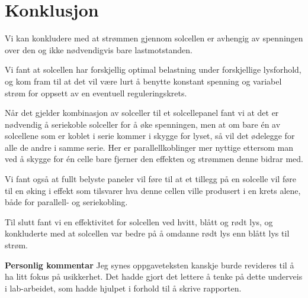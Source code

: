 \documentclass[a4paper,11pt, twocolumn]{article}
\begin{document}
\section{Konklusjon}
Vi kan konkludere med at strømmen gjennom solcellen er avhengig av spenningen over den og ikke nødvendigvis bare lastmotstanden. 

Vi fant at solcellen har forskjellig optimal belastning under forskjellige lysforhold, og kom fram til at det vil være lurt å benytte konstant spenning og variabel strøm for oppsett av en eventuell reguleringskrets. 

Når det gjelder kombinasjon av solceller til et solcellepanel fant vi at det er nødvendig å seriekoble solceller for å øke spenningen, men at om bare \'en av solcellene som er koblet i serie kommer i skygge for lyset, så vil det ødelegge for alle de andre i samme serie. Her er parallellkoblinger mer nyttige ettersom man ved å skygge for \'en celle bare fjerner den effekten og strømmen denne bidrar med.

Vi fant også at fullt belyste paneler vil føre til at et tillegg på en solcelle vil føre til en øking i effekt som tilsvarer hva denne cellen ville produsert i en krets alene, både for parallell- og seriekobling.

Til slutt fant vi en effektivitet for solcellen ved hvitt, blått og rødt lys, og konkluderte med at solcellen var bedre på å omdanne rødt lys enn blått lys til strøm.

{\bf Personlig kommentar}
Jeg synes oppgaveteksten kanskje burde revideres til å ha litt fokus på usikkerhet. Det hadde gjort det lettere å tenke på dette underveis i lab-arbeidet, som hadde hjulpet i forhold til å skrive rapporten.

\printbibliography
\clearpage
\onecolumn
\appendix


\end{document}
